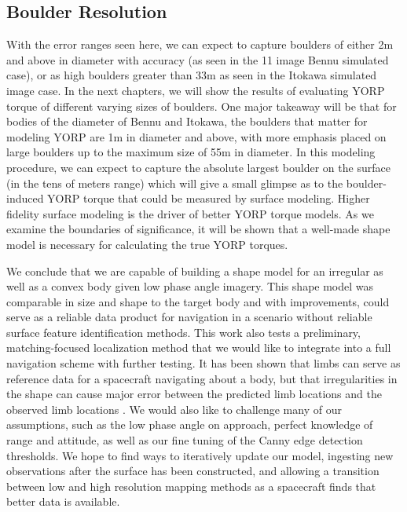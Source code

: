 \subsection{Boulder Resolution}
With the error ranges seen here, we can expect to capture boulders of either 2m and above in diameter with accuracy (as seen in the 11 image Bennu simulated case), or as high boulders greater than 33m as seen in the Itokawa simulated image case. In the next chapters, we will show the results of evaluating YORP torque of different varying sizes of boulders. One major takeaway will be that for bodies of the diameter of Bennu and Itokawa, the boulders that matter for modeling YORP are 1m in diameter and above, with more emphasis placed on large boulders up to the maximum size of 55m in diameter. In this modeling procedure, we can expect to capture the absolute largest boulder on the surface (in the tens of meters range) which will give a small glimpse as to the boulder-induced YORP torque that could be measured by surface modeling. Higher fidelity surface modeling is the driver of better YORP torque models. As we examine the boundaries of significance, it will be shown that a well-made shape model is necessary for calculating the true YORP torques.

We conclude that we are capable of building a shape model for an irregular as well as a convex body given low phase angle imagery. This shape model was comparable in size and shape to the target body and with improvements, could serve as a reliable data product for navigation in a scenario without reliable surface feature identification methods. This work also tests a preliminary, matching-focused localization method that we would like to integrate into a full navigation scheme with further testing. It has been shown that limbs can serve as reference data for a spacecraft navigating about a body, but that irregularities in the shape can cause major error between the predicted limb locations and the observed limb locations \cite{Liounis}. We would also like to challenge many of our assumptions, such as the low phase angle on approach, perfect knowledge of range and attitude, as well as our fine tuning of the Canny edge detection thresholds. We hope to find ways to iteratively update our model, ingesting new observations after the surface has been constructed, and allowing a transition between low and high resolution mapping methods as a spacecraft finds that better data is available.



